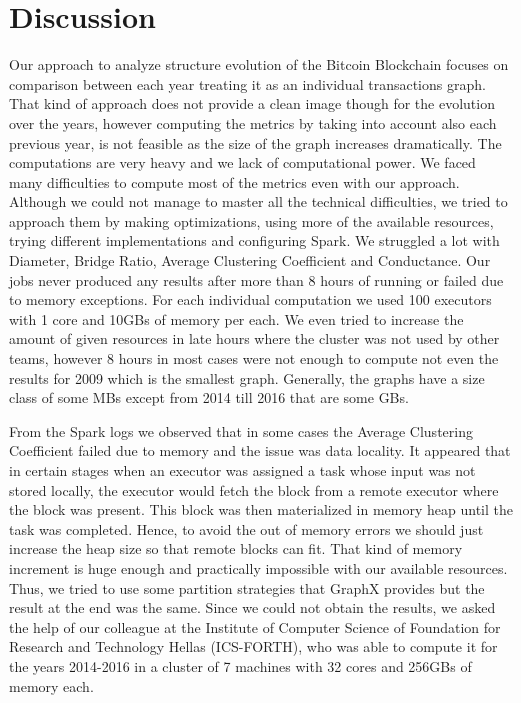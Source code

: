 \section{Discussion}
\label{sec:discussion} 
Our approach to analyze structure evolution of the Bitcoin Blockchain 
focuses on comparison between each year treating it as an individual transactions
graph. That kind of approach does not provide a clean image though for the evolution over the years,
however computing the metrics by taking into account also each
previous year, is not feasible as the size of the graph increases dramatically. The computations are very heavy and 
we lack of computational power. We faced many difficulties to compute most of the metrics even
with our approach. Although we could not manage to master all the technical
difficulties, we tried to approach them by making optimizations, using more of the available
resources, trying different implementations and configuring Spark. We struggled
a lot with Diameter, Bridge Ratio, Average Clustering Coefficient and
Conductance. Our jobs never produced any results after more than 8 hours of
running or failed due to memory exceptions. For each individual computation we
used 100 executors with 1 core and 10GBs of memory per each. We even tried to
increase the amount of given resources in late hours where the cluster was not
used by other teams, however 8 hours in most cases were not enough to
compute not even the results for 2009 which is the smallest graph. Generally,
the graphs have a size class of some MBs except from 2014
till 2016 that are some GBs. 

From the Spark logs we observed that in some cases the Average Clustering Coefficient failed due to memory and the issue was data locality. It appeared that in certain stages when an executor was assigned a task whose input was not stored locally, the executor would fetch the block from a remote executor where the block was present. This block was then materialized in memory heap until the task was completed. Hence, to avoid the out of memory errors we should just increase the heap size so that remote blocks can fit. That kind of memory increment is huge enough and practically impossible with our available resources. Thus, we tried to use some partition strategies that GraphX provides but the result at the end was the same. Since we could not obtain the results, we asked the help of our colleague at the Institute of Computer Science of Foundation for Research and Technology Hellas (ICS-FORTH), who was able to compute it for the years 2014-2016 in a cluster of 7 machines with 32 cores and 256GBs of memory each.

